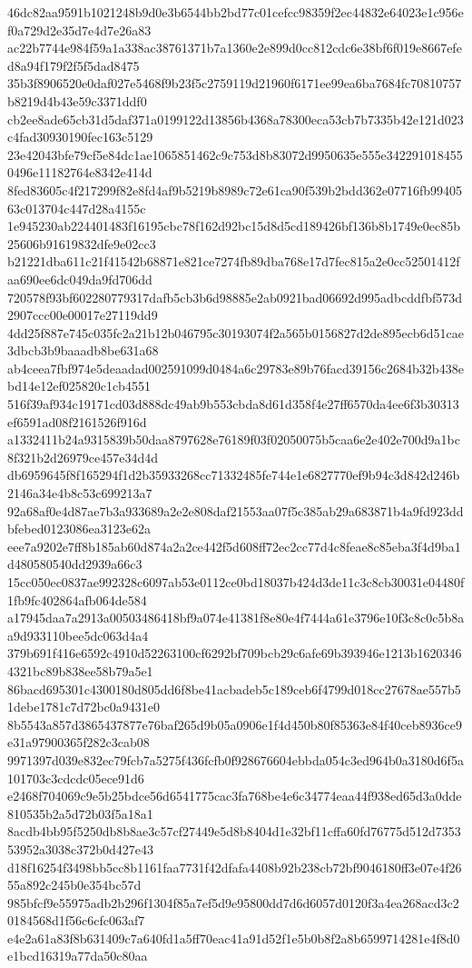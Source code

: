 {46dc82aa9591b1021248b9d0e3b6544bb2bd77c01cefcc98359f2ec44832e64023e1c956ef0a729d2e35d7e4d7e26a83
ac22b7744e984f59a1a338ac38761371b7a1360e2e899d0cc812cdc6e38bf6f019e8667efed8a94f179f2f5f5dad8475
35b3f8906520e0daf027e5468f9b23f5c2759119d21960f6171ee99ea6ba7684fc70810757b8219d4b43e59c3371ddf0
cb2ee8ade65cb31d5daf371a0199122d13856b4368a78300eca53cb7b7335b42e121d023c4fad30930190fec163c5129
23e42043bfe79cf5e84dc1ae1065851462c9c753d8b83072d9950635e555e3422910184550496e11182764e8342e414d
8fed83605c4f217299f82e8fd4af9b5219b8989c72e61ca90f539b2bdd362e07716fb9940563c013704c447d28a4155c
1e945230ab224401483f16195cbc78f162d92bc15d8d5cd189426bf136b8b1749e0ec85b25606b91619832dfe9e02cc3
b21221dba611c21f41542b68871e821ce7274fb89dba768e17d7fec815a2e0cc52501412faa690ee6dc049da9fd706dd
720578f93bf602280779317dafb5cb3b6d98885e2ab0921bad06692d995adbcddfbf573d2907ccc00e00017e27119dd9
4dd25f887e745c035fc2a21b12b046795c30193074f2a565b0156827d2de895ecb6d51cae3dbcb3b9baaadb8be631a68
ab4ceea7fbf974e5deaadad002591099d0484a6c29783e89b76facd39156c2684b32b438ebd14e12ef025820c1cb4551
516f39af934c19171cd03d888dc49ab9b553cbda8d61d358f4e27ff6570da4ee6f3b30313ef6591ad08f2161526f916d
a1332411b24a9315839b50daa8797628e76189f03f02050075b5caa6e2e402e700d9a1bc8f321b2d26979ce457e34d4d
db6959645f8f165294f1d2b35933268cc71332485fe744e1e6827770ef9b94c3d842d246b2146a34e4b8c53c699213a7
92a68af0e4d87ae7b3a933689a2e2e808daf21553aa07f5c385ab29a683871b4a9fd923ddbfebed0123086ea3123e62a
eee7a9202e7ff8b185ab60d874a2a2ce442f5d608ff72ec2cc77d4c8feae8c85eba3f4d9ba1d480580540dd2939a66c3
15cc050ec0837ae992328c6097ab53e0112ce0bd18037b424d3de11c3c8cb30031e04480f1fb9fc402864afb064de584
a17945daa7a2913a00503486418bf9a074e41381f8e80e4f7444a61e3796e10f3c8c0c5b8aa9d933110bee5dc063d4a4
379b691f416e6592c4910d52263100cf6292bf709bcb29c6afe69b393946e1213b16203464321bc89b838ee58b79a5e1
86bacd695301c4300180d805dd6f8be41acbadeb5c189ceb6f4799d018cc27678ae557b51debe1781c7d72bc0a9431e0
8b5543a857d3865437877e76baf265d9b05a0906e1f4d450b80f85363e84f40ceb8936ce9e31a97900365f282c3cab08
9971397d039e832ec79fcb7a5275f436fcfb0f928676604ebbda054c3ed964b0a3180d6f5a101703c3cdcdc05ece91d6
e2468f704069c9e5b25bdce56d6541775cac3fa768be4e6c34774eaa44f938ed65d3a0dde810535b2a5d72b03f5a18a1
8acdb4bb95f5250db8b8ae3c57cf27449e5d8b8404d1e32bf11cffa60fd76775d512d735353952a3038c372b0d427e43
d18f16254f3498bb5cc8b1161faa7731f42dfafa4408b92b238cb72bf9046180ff3e07e4f2655a892c245b0e354bc57d
985bfcf9e55975adb2b296f1304f85a7ef5d9e95800dd7d6d6057d0120f3a4ea268acd3c20184568d1f56c6cfc063af7
e4e2a61a83f8b631409c7a640fd1a5ff70eac41a91d52f1e5b0b8f2a8b6599714281e4f8d0e1bcd16319a77da50c80aa
}
